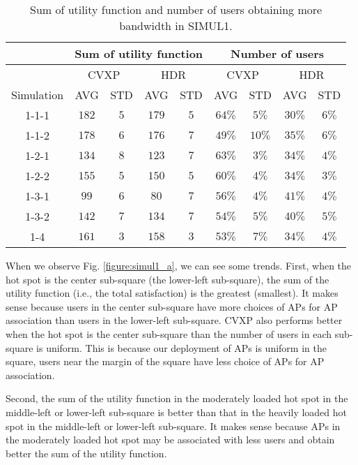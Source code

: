 	\begin{table} \small
		\centering \caption{Sum of utility function and number of users obtaining more bandwidth in SIMUL1.}
		\renewcommand\arraystretch{1.0}
		\begin{tabular}{|c||c|c||c|c||c|c||c|c|} %
			\hline
			&\multicolumn{4}{|c||}{Sum of utility function} & \multicolumn {4}{|c|}{Number of users} \\
			\hline & \multicolumn{2}{|c||}{CVXP} & \multicolumn{2}{|c||}{HDR} & \multicolumn{2}{|c||}{CVXP} & \multicolumn{2}{|c|}{HDR} \\
			\hline	Simulation & AVG & STD & AVG & STD & AVG & STD & AVG & STD \\
			\hline
			\hline	1-1-1 & $182$ & $5$ & $179$ & $5$ & $64\%$ & $5\%$ & $30\%$ & $6\%$ \\
			\hline	1-1-2 & $178$ & $6$ & $176$ & $7$ & $49\%$ & $10\%$ & $35\%$ & $6\%$ \\
			\hline	1-2-1 & $134$ & $8$ & $123$ & $7$ & $63\%$ & $3\%$ & $34\%$ & $4\%$ \\
			\hline	1-2-2 & $155$ & $5$ & $150$ & $5$ & $60\%$ & $4\%$ & $34\%$ & $3\%$ \\
			\hline	1-3-1 & $99$ & $6$ & $80$ & $7$ & $56\%$ & $4\%$ & $41\%$ & $4\%$ \\
			\hline	1-3-2 & $142$ & $7$ & $134$ & $7$ & $54\%$ & $5\%$ & $40\%$ & $5\%$ \\
			\hline	1-4 & $161$ & $3$ & $158$ & $3$ & $53\%$ & $7\%$ & $34\%$ & $4\%$ \\
			\hline
		\end{tabular}\label{Tab:simul1}
	\end{table}	
	When we observe Fig. \ref{figure:simul1_a}, we can see some trends. First, when the hot spot is the center sub-square (the lower-left sub-square), the sum of the utility function (i.e., the total satisfaction) is the greatest (smallest). It makes sense because users in the center sub-square have more choices of APs for AP association than users in the lower-left sub-square. CVXP also performs better when the hot spot is the center sub-square than the number of users in each sub-square is uniform. This is because our deployment of APs is uniform in the square, users near the margin of the square have less choice of APs for AP association.
	
	Second, the sum of the utility function in the moderately loaded hot spot in the middle-left or lower-left sub-square is better than that in the heavily loaded hot spot in the middle-left or lower-left sub-square. It makes sense because APs in the moderately loaded hot spot may be associated with less users and obtain better the sum of the utility function.
	
